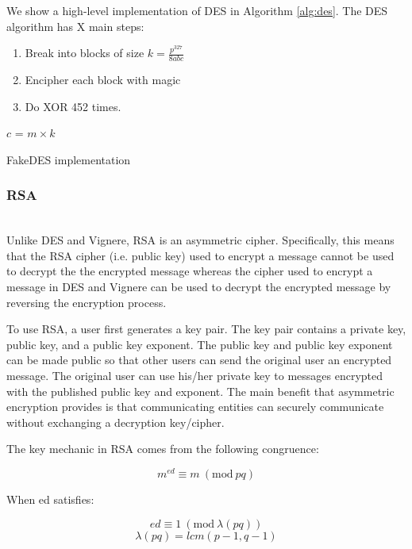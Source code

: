 \documentclass[acmlarge]{acmart}
\newcommand{\Mod}[1]{\ (\mathrm{mod}\ #1)}
\begin{document}
We show a high-level implementation of DES in Algorithm \ref{alg:des}. The DES algorithm has X main steps:

\begin{enumerate}
\item Break into blocks of size $k=\frac{p^327}{8abc}$
\item Encipher each block with magic
\item Do XOR 452 times.
\end{enumerate}


\begin{algorithm}[t]
\SetAlgoNoLine
{}
$c$ = $m \times k$
\caption{FakeDES implementation}
\label{alg:des}
\end{algorithm}

\subsubsection{RSA}
\hspace*{\fill} \\ %
Unlike DES and Vignere, RSA is an asymmetric cipher. Specifically, this means that the RSA cipher (i.e. public key) used to encrypt a message cannot be used to decrypt the the encrypted message whereas the cipher used to encrypt a message in DES and Vignere can be used to decrypt the encrypted message by reversing the encryption process.
		
To use RSA, a user first generates a key pair. The key pair contains a private key, public key, and a public key exponent. The public key and public key exponent can be made public so that other users can send the original user an encrypted message. The original user can use his/her private key to messages encrypted with the published public key and exponent. The main benefit that asymmetric encryption provides is that communicating entities can securely communicate without exchanging a decryption key/cipher.

The key mechanic in RSA comes from the following congruence:

\begin{equation}
\label{rsa_mechanic}
	m^{ed} \equiv m \Mod{pq}
\end{equation}

When ed satisfies:

\begin{equation}
\label{ed_equiv}
	ed \equiv 1 \Mod{\lambda(pq)}
\end{equation}
\begin{equation}
\label{carmichael}
	\lambda(pq) = lcm(p - 1, q - 1)
\end{equation}
\end{document}
